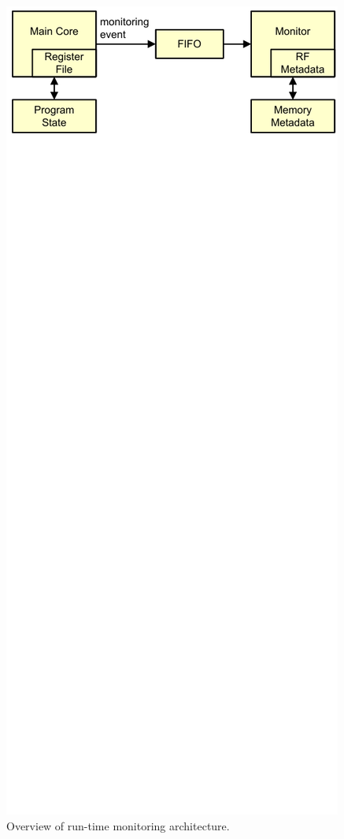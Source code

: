 \begin{figure}
  \begin{center}
    \includegraphics[width=\columnwidth]{figs/monitoring_architecture.pdf}
    \vspace{-0.2in}
    \caption{Overview of run-time monitoring architecture.}
    \label{fig:dropping.overview} 
    \vspace{-0.1in}
  \end{center}
\end{figure}

